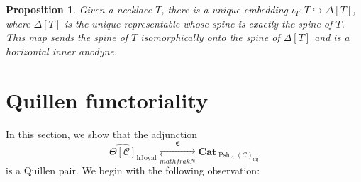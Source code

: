 \documentclass{amsart}
\numberwithin{equation}{section}
\theoremstyle{plain}   %
\newtheorem{prop}[subsection]{Proposition}
\theoremstyle{remark}
\theoremstyle{plain}
\DeclareMathOperator{\Psh}{Psh}
\newcommand{\Cat}{\ensuremath{\mathbf{Cat}}}
\newcommand{\C}{\ensuremath{\mathcal{C}}}
\newcommand{\cellset}{\ensuremath{\widehat{\Theta[\mathcal{C}]}}}
\begin{document}
\begin{prop}
	Given a necklace \(T\), there is a unique embedding \(\iota_T:T\hookrightarrow \Delta[T]\), where \(\Delta[T]\) is the unique representable whose spine is exactly the spine of \(T\).  This map sends the spine of \(T\) isomorphically onto the spine of \(\Delta[T]\) and is a horizontal inner anodyne.
\end{prop}

\section{Quillen functoriality}
In this section, we show that the adjunction \[\cellset_{\mathrm{hJoyal}} \underset{mathfrak{N}}{\overset{\mathfrak{C}}{\rightleftarrows}} \Cat_{\Psh_\Delta(\C)_{\mathrm{inj}}}\] is a Quillen pair. We begin with the following observation:
\end{document}
